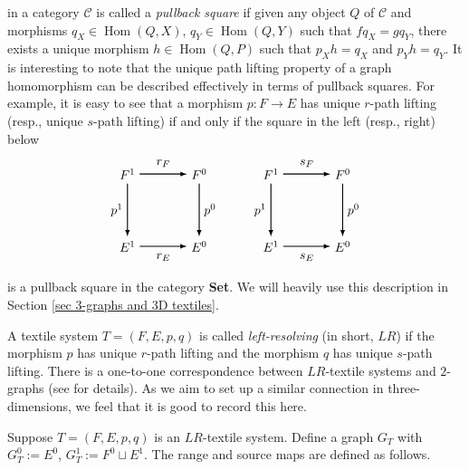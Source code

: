 \documentclass[a4paper,reqno,12pt]{amsart}
\newcommand{\Hom}{\operatorname{Hom}}
\theoremstyle{definition}
\theoremstyle{remark}
\begin{document}
in a category $\mathcal{C}$ is called a \emph{pullback square} if given any object $Q$ of $\mathcal{C}$ and morphisms $q_X\in \Hom(Q,X)$, $q_Y\in \Hom(Q,Y)$ such that $f q_X=g q_Y$, there exists a unique morphism $h\in \Hom(Q,P)$ such that $p_X h=q_X$ and $p_Y h=q_Y$. It is interesting to note that the unique path lifting property of a graph homomorphism can be described effectively in terms of pullback squares. For example, it is easy to see that a morphism $p:F\longrightarrow E$ has unique $r$-path lifting (resp., unique $s$-path lifting) if and only if the square in the left (resp., right) below
\[
\begin{tikzpicture}[scale=1]
\node[] (A1) at (0,0) {$F^1$};
\node[] (A2) at (2,0) {$F^0$};
\node[] (A3) at (4,0) {$F^1$};
\node[] (A4) at (6,0) {$F^0$};

\node[] (B1) at (0,-2) {$E^1$};
\node[] (B2) at (2,-2) {$E^0$};
\node[] (B3) at (4,-2) {$E^1$};
\node[] (B4) at (6,-2) {$E^0$};


\path[->, >=latex,thick] (A1) edge [] node[]{} (A2);
\path[->, >=latex,thick] (B1) edge [] node[]{} (B2);
\path[->, >=latex,thick] (A3) edge [] node[]{} (A4);
\path[->, >=latex,thick] (B3) edge [] node[]{} (B4);

\path[->, >=latex,thick] (A1) edge [] node[]{} (B1);
\path[->, >=latex,thick] (A2) edge [] node[]{} (B2);
\path[->, >=latex,thick] (A3) edge [] node[]{} (B3);
\path[->, >=latex,thick] (A4) edge [] node[]{} (B4);

\node at (1,0.3) {$r_F$};
\node at (5,0.3) {$s_F$};
\node at (1,-2.3) {$r_E$};
\node at (5,-2.3) {$s_E$};

\node at (-0.3,-1) {$p^1$};
\node at (2.3,-1) {$p^0$};
\node at (3.7,-1) {$p^1$};
\node at (6.3,-1) {$p^0$};
\end{tikzpicture}
\]
is a pullback square in the category \textbf{Set}. We will heavily use this description in Section \ref{sec 3-graphs and 3D textiles}. 

A textile system $T=(F,E,p,q)$ is called \emph{left-resolving} (in short, $LR$) if the morphism $p$ has unique $r$-path lifting and the morphism $q$ has unique $s$-path lifting. There is a one-to-one correspondence between $LR$-textile systems and $2$-graphs (see \cite[Chapter 3]{Tang} for details). As we aim to set up a similar connection in three-dimensions, we feel that it is good to record this here. 

Suppose $T=(F,E,p,q)$ is an $LR$-textile system. Define a graph $G_T$ with $G_T^0:=E^0$, $G_T^1:=F^0\sqcup E^1$. The range and source maps are defined as follows.
\end{document}
